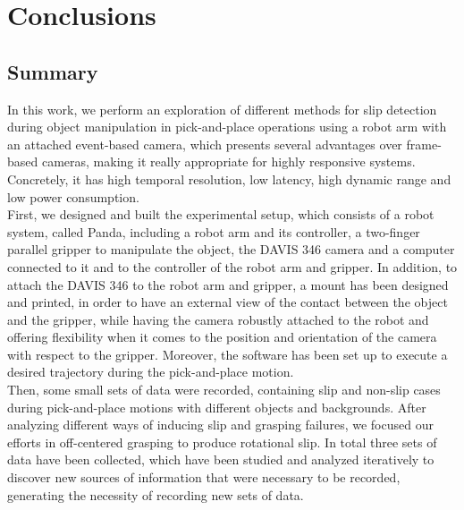 \cleardoublepage
\chapter{Conclusions}\label{sec:conclusions}

\section{Summary}

In this work, we perform an exploration of different methods for slip detection during object manipulation in pick-and-place operations using a robot arm with an attached event-based camera, which presents several advantages over frame-based cameras, making it really appropriate for highly responsive systems. Concretely, it has high temporal resolution, low latency, high dynamic range and low power consumption.\\

First, we designed and built the experimental setup, which consists of a robot system, called Panda, including a robot arm and its controller, a two-finger parallel gripper to manipulate the object, the DAVIS 346 camera and a computer connected to it and to the controller of the robot arm and gripper. In addition, to attach the DAVIS 346 to the robot arm and gripper, a mount has been designed and printed, in order to have an external view of the contact between the object and the gripper, while having the camera robustly attached to the robot and offering flexibility when it comes to the position and orientation of the camera with respect to the gripper. Moreover, the software has been set up to execute a desired trajectory during the pick-and-place motion.\\

Then, some small sets of data were recorded, containing slip and non-slip cases during pick-and-place motions with different objects and backgrounds. After analyzing different ways of inducing slip and grasping failures, we focused our efforts in off-centered grasping to produce rotational slip. In total three sets of data have been collected, which have been studied and analyzed iteratively to discover new sources of information that were necessary to be recorded, generating the necessity of recording new sets of data.\\

